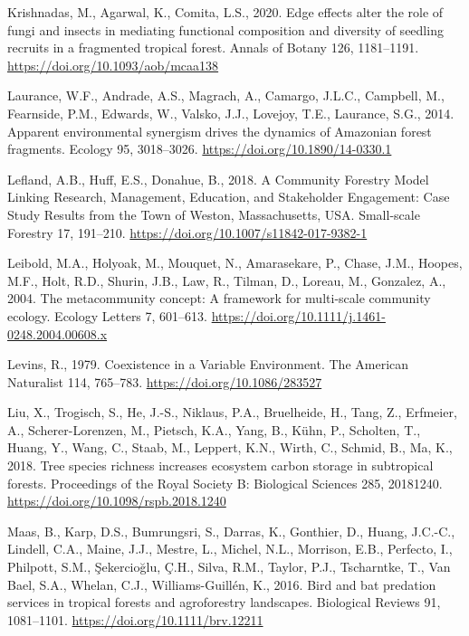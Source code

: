 \documentclass[
  12pt,
]{article}
\newlength{\cslhangindent}
\newlength{\cslentryspacingunit} %
\newenvironment{CSLReferences}[2] %
 {%
  \setlength{\parindent}{0pt}
  \ifodd #1
  \let\oldpar\par
  \def\par{\hangindent=\cslhangindent\oldpar}
  \fi
  \setlength{\parskip}{#2\cslentryspacingunit}
 }%
 {}
\begin{document}
\begin{CSLReferences}{1}{0}
\leavevmode{}%
Krishnadas, M., Agarwal, K., Comita, L.S., 2020. Edge effects alter the role of fungi and insects in mediating functional composition and diversity of seedling recruits in a fragmented tropical forest. Annals of Botany 126, 1181--1191. \url{https://doi.org/10.1093/aob/mcaa138}

\leavevmode{}%
Laurance, W.F., Andrade, A.S., Magrach, A., Camargo, J.L.C., Campbell, M., Fearnside, P.M., Edwards, W., Valsko, J.J., Lovejoy, T.E., Laurance, S.G., 2014. Apparent environmental synergism drives the dynamics of {Amazonian} forest fragments. Ecology 95, 3018--3026. \url{https://doi.org/10.1890/14-0330.1}

\leavevmode{}%
Lefland, A.B., Huff, E.S., Donahue, B., 2018. A {Community Forestry Model Linking Research}, {Management}, {Education}, and {Stakeholder Engagement}: {Case Study Results} from the {Town} of {Weston}, {Massachusetts}, {USA}. Small-scale Forestry 17, 191--210. \url{https://doi.org/10.1007/s11842-017-9382-1}

\leavevmode{}%
Leibold, M.A., Holyoak, M., Mouquet, N., Amarasekare, P., Chase, J.M., Hoopes, M.F., Holt, R.D., Shurin, J.B., Law, R., Tilman, D., Loreau, M., Gonzalez, A., 2004. The metacommunity concept: {A} framework for multi-scale community ecology. Ecology Letters 7, 601--613. \url{https://doi.org/10.1111/j.1461-0248.2004.00608.x}

\leavevmode{}%
Levins, R., 1979. Coexistence in a {Variable Environment}. The American Naturalist 114, 765--783. \url{https://doi.org/10.1086/283527}

\leavevmode{}%
Liu, X., Trogisch, S., He, J.-S., Niklaus, P.A., Bruelheide, H., Tang, Z., Erfmeier, A., Scherer-Lorenzen, M., Pietsch, K.A., Yang, B., Kühn, P., Scholten, T., Huang, Y., Wang, C., Staab, M., Leppert, K.N., Wirth, C., Schmid, B., Ma, K., 2018. Tree species richness increases ecosystem carbon storage in subtropical forests. Proceedings of the Royal Society B: Biological Sciences 285, 20181240. \url{https://doi.org/10.1098/rspb.2018.1240}

\leavevmode{}%
Maas, B., Karp, D.S., Bumrungsri, S., Darras, K., Gonthier, D., Huang, J.C.-C., Lindell, C.A., Maine, J.J., Mestre, L., Michel, N.L., Morrison, E.B., Perfecto, I., Philpott, S.M., Şekercioğlu, Ç.H., Silva, R.M., Taylor, P.J., Tscharntke, T., Van Bael, S.A., Whelan, C.J., Williams-Guillén, K., 2016. Bird and bat predation services in tropical forests and agroforestry landscapes. Biological Reviews 91, 1081--1101. \url{https://doi.org/10.1111/brv.12211}


\end{CSLReferences}
\end{document}
